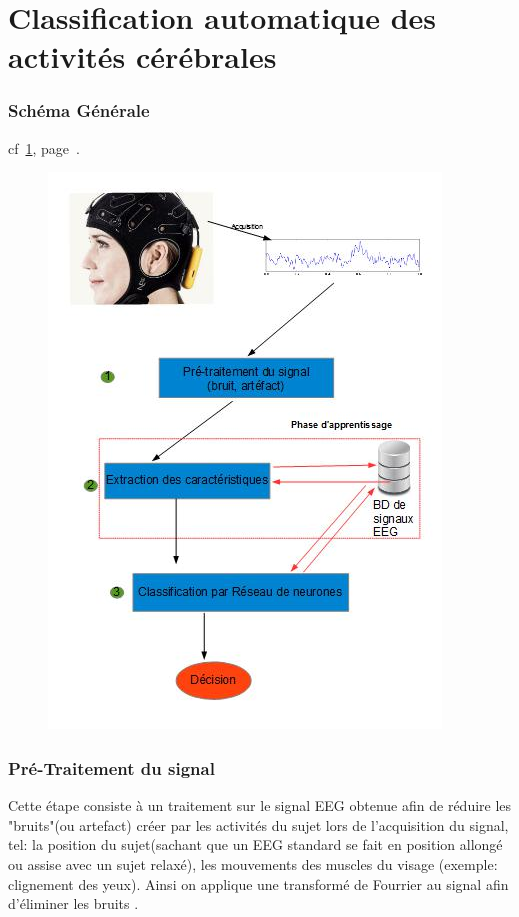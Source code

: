 \part{Classification automatique des activités cérébrales} %
\label{prt:classification_ _automatique_ _des_ _activités_ _cérébrales_}
	\section{Schéma Générale} %
	cf~\ref{fig_orga}, page~\pageref{fig_orga}.
		\label{sec:schéma_générale}
		\begin{figure}[t]
			\centering
			    \includegraphics{../organigramme/orga.jpg} \\
				\label{fig_orga}
			\end{figure}

	\section{Pré-Traitement du signal} %
	\label{sec:pré_traitement_du_signal}
Cette étape consiste à un traitement sur le signal EEG obtenue afin de réduire les "bruits"(ou artefact) créer par les activités du sujet lors de l’acquisition du signal, tel: la position du sujet(sachant que un EEG standard se fait en position allongé ou assise avec un sujet relaxé), les mouvements des muscles du visage (exemple: clignement des yeux). Ainsi on applique une transformé de Fourrier au signal afin d'éliminer les bruits .
	
